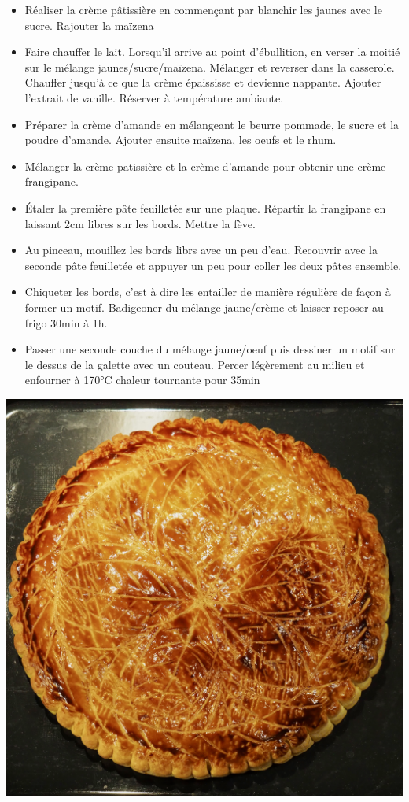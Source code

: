 \documentclass[]{book}
\providecommand{\tightlist}{%
  \setlength{\itemsep}{0pt}\setlength{\parskip}{0pt}}
\begin{document}
\begin{itemize}
\tightlist
\item
  Réaliser la crème pâtissière en commençant par blanchir les jaunes
  avec le sucre. Rajouter la maïzena
\item
  Faire chauffer le lait. Lorsqu'il arrive au point d'ébullition, en
  verser la moitié sur le mélange jaunes/sucre/maïzena. Mélanger et
  reverser dans la casserole. Chauffer jusqu'à ce que la crème
  épaississe et devienne nappante. Ajouter l'extrait de vanille.
  Réserver à température ambiante.
\item
  Préparer la crème d'amande en mélangeant le beurre pommade, le sucre
  et la poudre d'amande. Ajouter ensuite maïzena, les oeufs et le rhum.
\item
  Mélanger la crème patissière et la crème d'amande pour obtenir une
  crème frangipane.
\item
  Étaler la première pâte feuilletée sur une plaque. Répartir la
  frangipane en laissant 2cm libres sur les bords. Mettre la fève.
\item
  Au pinceau, mouillez les bords librs avec un peu d'eau. Recouvrir avec
  la seconde pâte feuilletée et appuyer un peu pour coller les deux
  pâtes ensemble.
\item
  Chiqueter les bords, c'est à dire les entailler de manière régulière
  de façon à former un motif. Badigeoner du mélange jaune/crème et
  laisser reposer au frigo 30min à 1h.
\item
  Passer une seconde couche du mélange jaune/oeuf puis dessiner un motif
  sur le dessus de la galette avec un couteau. Percer légèrement au
  milieu et enfourner à 170°C chaleur tournante pour 35min
\end{itemize}

\begin{center}\includegraphics[width=0.9\linewidth]{photos/galette1} \end{center}
\end{document}
